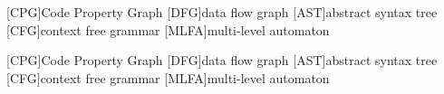 
[CPG]{Code Property Graph}
[DFG]{data flow graph}
[AST]{abstract syntax tree}
[CFG]{context free grammar}
[MLFA]{multi-level automaton}

[CPG]{Code Property Graph}
[DFG]{data flow graph}
[AST]{abstract syntax tree}
[CFG]{context free grammar}
[MLFA]{multi-level automaton}

